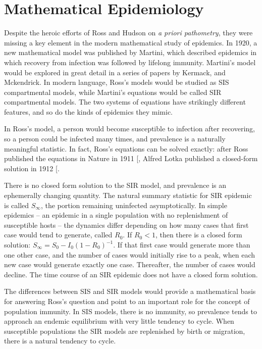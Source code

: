 \documentclass[
]{book}
\begin{document}
\section{Mathematical Epidemiology}\label{mathematical-epidemiology}

Despite the heroic efforts of Ross and Hudson on \emph{a priori pathometry}, they were missing a key element in the modern mathematical study of epidemics. In 1920, a new mathematical model was published by Martini, which described epidemics in which recovery from infection was followed by lifelong immunity.
Martini's model would be explored in great detail in a series of papers by Kermack, and Mckendrick.
In modern language, Ross's models would be studied as SIS compartmental models, while Martini's equations would be called SIR compartmental models.
The two systems of equations have strikingly different features, and so do the kinds of epidemics they mimic.

In Ross's model, a person would become susceptible to infection after recovering, so a person could be infected many times, and prevalence is a naturally meaningful statistic. In fact, Ross's equations can be solved exactly: after Ross published the equations in Nature in 1911 {[}\citeproc{ref-RossR1911Nature}{28}{]}, Alfred Lotka published a closed-form solution in 1912 {[}\citeproc{ref-LotkaAJ1912Nature}{50}{]}.

There is no closed form solution to the SIR model, and prevalence is an ephemerally changing quantity.
The natural summary statistic for SIR epidemic is called \(S_\infty\), the portion remaining uninfected asymptotically.
In simple epidemics -- an epidemic in a single population with no replenishment of susceptible hosts -- the dynamics differ depending on how many cases that first case would tend to generate, called \(R_0\).
If \(R_0 < 1\), then there is a closed form solution: \(S_\infty = S_0 - I_0(1-R_0)^{-1}\).
If that first case would generate more than one other case, and the number of cases would initially rise to a peak, when each new case would generate exactly one case.
Thereafter, the number of cases would decline.
The time course of an SIR epidemic does not have a closed form solution.

The differences between SIS and SIR models would provide a mathematical basis for answering Ross's question and point to an important role for the concept of population immunity.
In SIS models, there is no immunity, so prevalence tends to approach an endemic equilibrium with very little tendency to cycle.
When susceptible populations the SIR models are replenished by birth or migration, there is a natural tendency to cycle.
\end{document}
